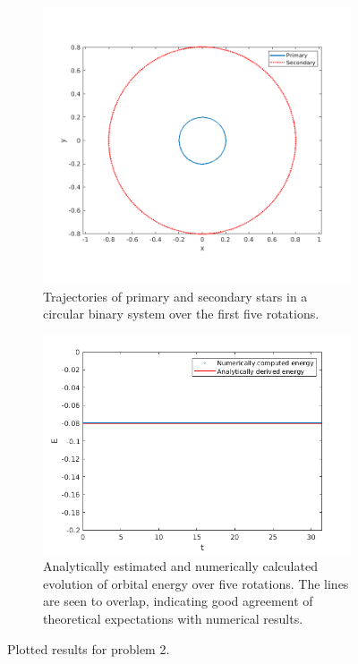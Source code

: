 \documentclass[a4paper]{article}
\begin{document}
\begin{enumerate} [label*=\textbf{(\alph*)}]
			\begin{figure} [h]
				\begin{subfigure} {.475\columnwidth}
					\includegraphics[width=\columnwidth]{../plots/2c_orbits.png}
					\caption{Trajectories of primary and secondary stars in a circular binary system over the first five rotations.}
					\label{fig:2c}
				\end{subfigure}
				\hfill
				\begin{subfigure} {.485\columnwidth}
					\includegraphics[width=\columnwidth]{../plots/2d_energies.png}
					\caption{Analytically estimated and numerically calculated evolution of orbital energy over five rotations. The lines are seen to overlap, indicating good agreement of theoretical expectations with numerical results.}
					\label{fig:2d}
				\end{subfigure}
				\caption{Plotted results for problem 2.}
				\label{fig:2}
			\end{figure}
		

\end{enumerate}
\end{document}
